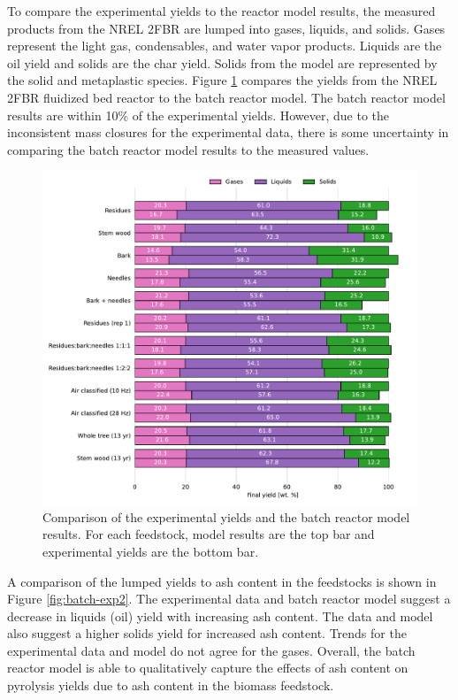 To compare the experimental yields to the reactor model results, the measured products from the NREL 2FBR are lumped into gases, liquids, and solids. Gases represent the light gas, condensables, and water vapor products. Liquids are the oil yield and solids are the char yield. Solids from the model are represented by the solid and metaplastic species. Figure \ref{fig:batch-exp1} compares the yields from the NREL 2FBR fluidized bed reactor to the batch reactor model. The batch reactor model results are within 10\% of the experimental yields. However, due to the inconsistent mass closures for the experimental data, there is some uncertainty in comparing the batch reactor model results to the measured values.

\begin{figure}[H]
    \centering
    \includegraphics[width=\textwidth]{figures/batch-exp1.pdf}
    \caption{Comparison of the experimental yields and the batch reactor model results. For each feedstock, model results are the top bar and experimental yields are the bottom bar.}
    \label{fig:batch-exp1}
\end{figure}

A comparison of the lumped yields to ash content in the feedstocks is shown in Figure \ref{fig:batch-exp2}. The experimental data and batch reactor model suggest a decrease in liquids (oil) yield with increasing ash content. The data and model also suggest a higher solids yield for increased ash content. Trends for the experimental data and model do not agree for the gases. Overall, the batch reactor model is able to qualitatively capture the effects of ash content on pyrolysis yields due to ash content in the biomass feedstock.

